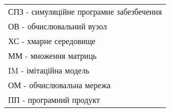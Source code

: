 
\begin{tabular}{l}
	\\
	СПЗ - симуляційне програмне забезбечення
	\\
	ОВ  - обчислювальний вузол
	\\
	ХС  - хмарне середовище
	\\
	ММ  - множення матриць
	\\
	IM  - імітаційна модель
	\\
	ОМ  - обчислювальна мережа
	\\
	ПП  - програмний продукт
\end{tabular}